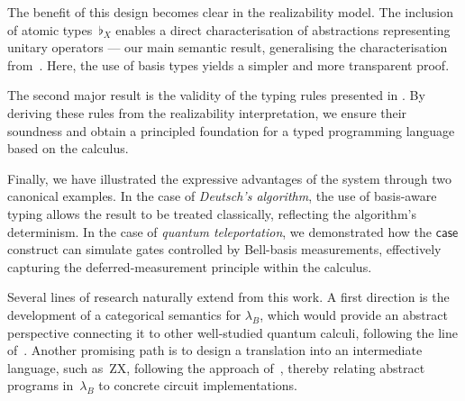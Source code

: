 \documentclass[runningheads,orivec,envcountsame,envcountsect]{llncs}
\newcommand{\lambdaB}{\lambda_B}
\newcommand\basis[1]{\ensuremath{\flat_{#1}}}
\begin{document}
The benefit of this design becomes clear in the realizability model.
The inclusion of atomic types~$\basis{X}$ enables a direct characterisation of
abstractions representing unitary operators --- our main semantic result,
generalising the characterisation from~\cite{DiazcaroGuillermoMiquelValironLICS19}.  
Here, the use of basis types yields a simpler and more transparent proof.  

The second major result is the validity of the typing rules presented in
.  
By deriving these rules from the realizability interpretation, we ensure their
soundness and obtain a principled foundation for a typed programming language
based on the calculus.

Finally, we have illustrated the expressive advantages of the system through two
canonical examples.  
In the case of \emph{Deutsch's algorithm}, the use of basis-aware typing allows
the result to be treated classically, reflecting the algorithm's determinism.  
In the case of \emph{quantum teleportation}, we demonstrated how the
$\mathsf{case}$ construct can simulate gates controlled by Bell-basis
measurements, effectively capturing the deferred-measurement principle within
the calculus.

Several lines of research naturally extend from this work.  
A first direction is the development of a categorical semantics for $\lambdaB$,
which would provide an abstract perspective connecting it to other well-studied
quantum calculi, following the line of~\cite{DiazcaroCIE2025}.  
Another promising path is to design a translation into an intermediate language,
such as~ZX, following the approach of~\cite{BorgnaRomeroQPL22}, thereby relating
abstract programs in~$\lambdaB$ to concrete circuit implementations.

%
%
%
%


\end{document}
